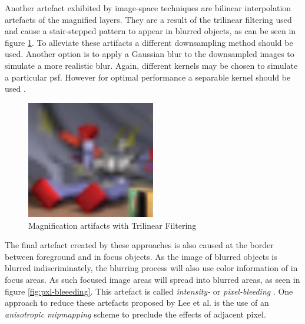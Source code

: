 Another artefact exhibited by image-space techniques are bilinear interpolation artefacts of the magnified layers.
They are a result of the trilinear filtering used and cause a stair-stepped pattern to appear in blurred objects, as can be seen in figure \ref{fig:trilinear-filtering}.
To alleviate these artifacts a different downsampling method should be used.
Another option is to apply a Gaussian blur to the downsampled images to simulate a more realistic blur.
Again, different kernels may be chosen to simulate a particular \gls{psf}.
However for optimal performance a separable kernel should be used \cite{Demers.2005, Gilham.2007}.


\begin{figure}[h]
    \centering
    \includegraphics[width=0.5\textwidth]{images/trilinear-filtering.jpg}
    \caption{Magnification artifacts with Trilinear Filtering \cite{Demers.2005}}
    \label{fig:trilinear-filtering}
\end{figure}

The final artefact created by these approaches is also caused at the border between foreground and in focus objects.
As the image of blurred objects is blurred indiscriminately, the blurring process will also use color information of in focus areas.
As such focused image areas will spread into blurred areas, as seen in figure \ref{fig:pxl-bleeeding}.
This artefact is called \textit{intensity-} or \textit{pixel-bleeding} \cite{Demers.2005}.
One approach to reduce these artefacts proposed by Lee et al. \cite{Lee.2009} is the use of an \textit{anisotropic mipmapping} scheme to preclude the effects of adjacent pixel.


